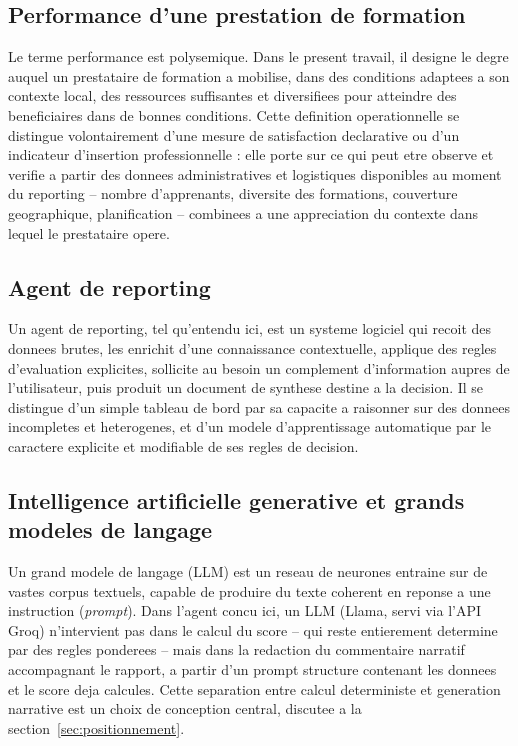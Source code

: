 \documentclass[12pt,a4paper,twoside,openany]{report}
\begin{document}
\subsection{Performance d'une prestation de formation}

Le terme performance est polysemique. Dans le present travail, il designe le degre auquel un prestataire de formation a mobilise, dans des conditions adaptees a son contexte local, des ressources suffisantes et diversifiees pour atteindre des beneficiaires dans de bonnes conditions. Cette definition operationnelle se distingue volontairement d'une mesure de satisfaction declarative ou d'un indicateur d'insertion professionnelle : elle porte sur ce qui peut etre observe et verifie a partir des donnees administratives et logistiques disponibles au moment du reporting -- nombre d'apprenants, diversite des formations, couverture geographique, planification -- combinees a une appreciation du contexte dans lequel le prestataire opere.

\subsection{Agent de reporting}

Un agent de reporting, tel qu'entendu ici, est un systeme logiciel qui recoit des donnees brutes, les enrichit d'une connaissance contextuelle, applique des regles d'evaluation explicites, sollicite au besoin un complement d'information aupres de l'utilisateur, puis produit un document de synthese destine a la decision. Il se distingue d'un simple tableau de bord par sa capacite a raisonner sur des donnees incompletes et heterogenes, et d'un modele d'apprentissage automatique par le caractere explicite et modifiable de ses regles de decision.

\subsection{Intelligence artificielle generative et grands modeles de langage}

Un grand modele de langage (LLM) est un reseau de neurones entraine sur de vastes corpus textuels, capable de produire du texte coherent en reponse a une instruction (\textit{prompt}). Dans l'agent concu ici, un LLM (Llama, servi via l'API Groq) n'intervient pas dans le calcul du score -- qui reste entierement determine par des regles ponderees -- mais dans la redaction du commentaire narratif accompagnant le rapport, a partir d'un prompt structure contenant les donnees et le score deja calcules. Cette separation entre calcul deterministe et generation narrative est un choix de conception central, discutee a la section~\ref{sec:positionnement}.
\end{document}
